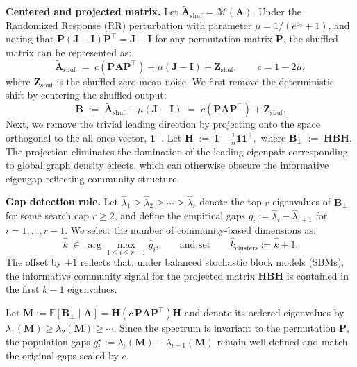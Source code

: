 \documentclass[11pt]{article}
\theoremstyle{plain}
\theoremstyle{definition}
\theoremstyle{remark}
\begin{document}
\textbf{Centered and projected matrix.}
Let $\widetilde{\mathbf{A}}_{\text{shuf}} = \mathcal{M}(\mathbf{A})$. Under the Randomized Response (RR) perturbation with parameter $\mu=1/(e^{\varepsilon_0}+1)$, and noting that $\mathbf{P}(\mathbf{J}-\mathbf{I})\mathbf{P}^\top = \mathbf{J}-\mathbf{I}$ for any permutation matrix $\mathbf{P}$, the shuffled matrix can be represented as:
\begin{equation*}
\widetilde{\mathbf A}_{\text{shuf}} \;=\; c(\mathbf{P}\mathbf{A}\mathbf{P}^\top) + \mu(\mathbf{J}-\mathbf{I}) + \mathbf{Z}_{\text{shuf}},
\qquad c=1-2\mu,
\end{equation*}
where $\mathbf Z_{\text{shuf}}$ is the shuffled zero-mean noise. We first remove the deterministic shift by centering the shuffled output:
\begin{equation*}
\mathbf B \;:=\; \widetilde{\mathbf A}_{\text{shuf}} - \mu(\mathbf J-\mathbf I) \;=\; c(\mathbf{P}\mathbf{A}\mathbf{P}^\top) + \mathbf{Z}_{\text{shuf}} .
\end{equation*}
Next, we remove the trivial leading direction by projecting onto the space orthogonal to the all-ones vector, $\mathbf 1^\perp$. Let $\mathbf H \;:=\; \mathbf I - \frac{1}{n}\mathbf 1\mathbf 1^\top,$ where $\mathbf B_\perp \;:=\; \mathbf H \mathbf B \mathbf H.$
The projection eliminates the domination of the leading eigenpair corresponding to global graph density effects, which can otherwise obscure the informative eigengap reflecting community structure.

\textbf{Gap detection rule.}
Let $\hat\lambda_1\ge \hat\lambda_2\ge \cdots \ge \hat\lambda_r$ denote the top-$r$ eigenvalues of $\mathbf B_\perp$ for some search cap $r\ge 2$, and define the empirical gaps $\hat g_i := \hat\lambda_i-\hat\lambda_{i+1}$ for $i=1,\dots,r-1$. We select the number of community-based dimensions as:
\begin{equation*}
\hat k \;\in\; \arg\max_{1\le i\le r-1} \hat g_i, \qquad\text{and set}\qquad \widehat{k}_{\mathrm{clusters}}:=\hat k+1.
\end{equation*}
The offset by $+1$ reflects that, under balanced stochastic block models (SBMs), the informative community signal for the projected matrix $\mathbf H \mathbf B \mathbf H$ is contained in the first $k-1$ eigenvalues.

Let $\mathbf M := \mathbb E[\mathbf B_\perp \mid \mathbf A] = \mathbf H (c\,\mathbf P\mathbf A\mathbf P^\top)\mathbf H$ and denote its ordered eigenvalues by $\lambda_1(\mathbf M)\ge \lambda_2(\mathbf M)\ge\cdots$. Since the spectrum is invariant to the permutation $\mathbf{P}$, the population gaps $g_i^\star := \lambda_i(\mathbf M)-\lambda_{i+1}(\mathbf M)$ remain well-defined and match the original gaps scaled by $c$.
\end{document}
